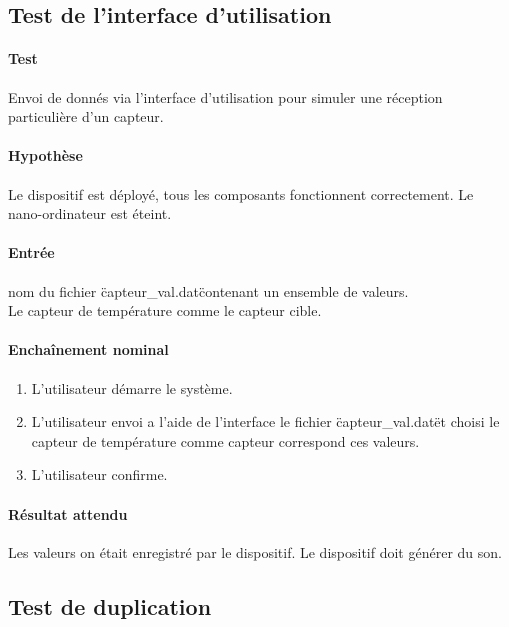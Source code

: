 \documentclass[a4paper, titlepage, oneside, 12pt]{article}%
\begin{document}
\subsection{Test de l'interface d'utilisation}
\paragraph{Test\\}
Envoi de donnés via l'interface d'utilisation pour simuler une réception particulière d'un capteur.

\paragraph{Hypothèse\\}
Le dispositif est déployé, tous les composants fonctionnent correctement.
Le nano-ordinateur est éteint.

\paragraph{Entrée\\}
nom du fichier \"capteur\_val.dat\" contenant un ensemble de valeurs.\\
Le capteur de température comme le capteur cible.


\paragraph{Enchaînement nominal}
\begin {enumerate}
\item L'utilisateur démarre le système.
\item L'utilisateur envoi a l'aide de l'interface le fichier \"capteur\_val.dat\" et choisi le capteur de température comme capteur correspond ces valeurs.
\item L'utilisateur confirme.
\end{enumerate}

\paragraph{Résultat attendu\\}
Les valeurs on était enregistré par le dispositif. Le dispositif doit générer du son.


\subsection{Test de duplication}
\end{document}
